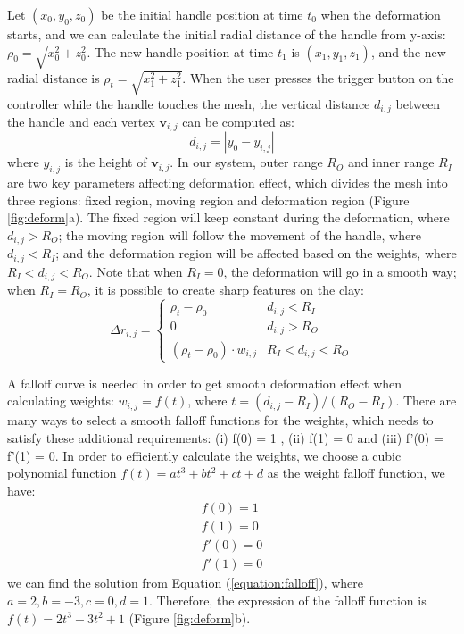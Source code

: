 \documentclass{svjour3}                     %
\begin{document}
Let $(x_{0},y_{0},z_{0})$ be the initial handle position at time $t_{0}$ when the deformation starts, and we can calculate the initial radial distance of the handle from y-axis: $\rho_{0} = \sqrt{x_{0}^2 + z_{0}^2}$. The new handle position at time $t_{1}$ is $(x_{1},y_{1},z_{1})$, and the new radial distance is $\rho_{t} = \sqrt{x_{1}^2 + z_{1}^2}$.
When the user presses the trigger button on the controller while the handle touches the mesh, the vertical distance $d_{i,j}$ between the handle and each vertex $\mathbf{v}_{i,j}$ can be computed as:
\begin{equation}
d_{i,j} = |y_{0} - y_{i,j}|
\end{equation}
where $y_{i,j}$ is the height of $\mathbf{v}_{i,j}$.
In our system, outer range $R_{O}$ and inner range $R_{I}$ are two key parameters affecting deformation effect, which divides the mesh into three regions: fixed region, moving region and  deformation region (Figure \ref{fig:deform}a).
The fixed region will keep constant during the deformation, where $d_{i,j} > R_{O}$; the moving region will follow the movement of the handle, where $d_{i,j} < R_{I}$; and the deformation region will be affected based on the weights, where $R_{I} < d_{i,j} < R_{O}$.
Note that when $R_{I} = 0$, the deformation will go in a smooth way; when $R_{I} = R_{O}$, it is possible to create sharp features on the clay:
\begin{equation}
\Delta r_{i,j} = \begin{cases}
\rho_{t} - \rho_{0} &  d_{i,j} < R_{I} \\
0 &  d_{i,j} > R_{O} \\
(\rho_{t} - \rho_{0}) \cdot w_{i,j} &  R_{I} < d_{i,j} < R_{O}
\end{cases}
\end{equation}

A falloff curve is needed in order to get smooth deformation effect when calculating weights: $w_{i,j} = f(t)$, where $t = (d_{i,j} - R_{I}) / (R_{O} - R_{I})$.
There are many ways to select a smooth falloff functions for the weights, which needs to satisfy these additional requirements: (i) f(0) = 1 , (ii) f(1) = 0 and (iii) f'(0) = f'(1) = 0.
In order to efficiently calculate the weights, we choose a cubic polynomial function $f(t) = at^3 + bt^2 + ct + d$ as the weight falloff function, we have:
\begin{equation}
\begin{aligned}
\label{equation:falloff}
f(0) = 1 \\
f(1) = 0 \\ 
f'(0) = 0 \\
f'(1) = 0
\end{aligned}
\end{equation}
we can find the solution from Equation (\ref{equation:falloff}), where 
$a = 2, b = -3, c = 0, d = 1$. Therefore, the expression of the falloff function is $f(t) = 2t^3 - 3t^2 + 1$ (Figure \ref{fig:deform}b).
\end{document}
